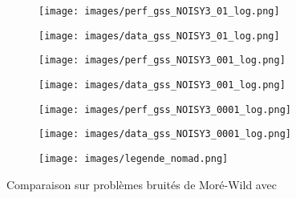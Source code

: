 	\begin{figure}[!htb] %
		\centering
		\begin{subfigure}{0.43\textwidth}
			\texttt{[image: images/perf\_gss\_NOISY3\_01\_log.png]}
		\end{subfigure}%
		\begin{subfigure}{0.43\textwidth}
			\texttt{[image: images/data\_gss\_NOISY3\_01\_log.png]}
		\end{subfigure}
		\smallskip
		\begin{subfigure}{0.43\textwidth}
			\texttt{[image: images/perf\_gss\_NOISY3\_001\_log.png]}
		\end{subfigure}%
		\begin{subfigure}{0.43\textwidth}
			\texttt{[image: images/data\_gss\_NOISY3\_001\_log.png]}
		\end{subfigure}
		\smallskip
		\begin{subfigure}{0.43\textwidth}
			\texttt{[image: images/perf\_gss\_NOISY3\_0001\_log.png]}
		\end{subfigure}%
		\begin{subfigure}{0.43\textwidth}
			\texttt{[image: images/data\_gss\_NOISY3\_0001\_log.png]}
		\end{subfigure}
		\smallskip
		\begin{subfigure}{0.95\textwidth}
			\texttt{[image: images/legende\_nomad.png]}
		\end{subfigure}
		\caption{Comparaison sur problèmes bruités de Moré-Wild avec \MADS} \label{fig:3}
	\end{figure}
	\clearpage
